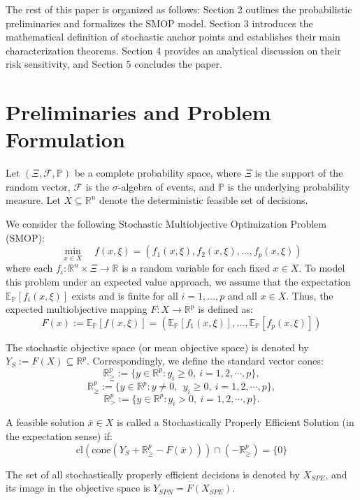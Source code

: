 \documentclass[twoside]{article}
\begin{document}
The rest of this paper is organized as follows: Section 2 outlines the probabilistic preliminaries and formalizes the SMOP model. Section 3 introduces the mathematical definition of stochastic anchor points and establishes their main characterization theorems. Section 4 provides an analytical discussion on their risk sensitivity, and Section 5 concludes the paper.

\section{Preliminaries and Problem Formulation}
Let $(\Xi, \mathcal{F}, \mathbb{P})$ be a complete probability space, where $\Xi$ is the support of the random vector, $\mathcal{F}$ is the $\sigma$-algebra of events, and $\mathbb{P}$ is the underlying probability measure. Let $X \subseteq \mathbb{R}^n$ denote the deterministic feasible set of decisions. 

We consider the following Stochastic Multiobjective Optimization Problem (SMOP):
\begin{equation}
\min_{x \in X} \quad f(x, \xi) = \left( f_1(x, \xi), f_2(x, \xi), \dots, f_p(x, \xi) \right)
\end{equation}
where each $f_i: \mathbb{R}^n \times \Xi \rightarrow \mathbb{R}$ is a random variable for each fixed $x \in X$. To model this problem under an expected value approach, we assume that the expectation $\mathbb{E}_{\mathbb{P}}[f_i(x, \xi)]$ exists and is finite for all $i = 1, \dots, p$ and all $x \in X$. Thus, the expected multiobjective mapping $F: X \rightarrow \mathbb{R}^p$ is defined as:
\begin{equation}
F(x) := \mathbb{E}_{\mathbb{P}}[f(x, \xi)] = \left( \mathbb{E}_{\mathbb{P}}[f_1(x, \xi)], \dots, \mathbb{E}_{\mathbb{P}}[f_p(x, \xi)] \right)
\end{equation}

The stochastic objective space (or mean objective space) is denoted by $Y_S := F(X) \subseteq \mathbb{R}^p$. Correspondingly, we define the standard vector cones:
$$\mathbb{R}^p_{\geqq} := \{y \in \mathbb{R}^p : y_i \ge 0,~i=1,2,\cdots ,p \},$$
$$\mathbb{R}^p_{\geq} := \{y \in \mathbb{R}^p : y\neq 0,~~y_i \ge 0,~i=1,2,\cdots ,p \},$$
$$\mathbb{R}^p_{>} := \{y \in \mathbb{R}^p : y_i > 0,~i=1,2,\cdots ,p \}.$$

\begin{dfn}
	A feasible solution $\bar{x} \in X$ is called a Stochastically Properly Efficient Solution (in the expectation sense) if:
	\begin{equation}
	\text{cl}\left( \text{cone}\left( Y_S + \mathbb{R}^p_{\ge} - F(\bar{x}) \right) \right) \cap (-\mathbb{R}^p_{\ge}) = \{0\}
	\end{equation}
\end{dfn}
The set of all stochastically properly efficient decisions is denoted by $X_{SPE}$, and its image in the objective space is $Y_{SPN} = F(X_{SPE})$.
\end{document}
